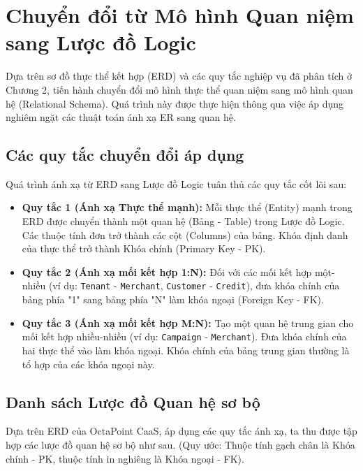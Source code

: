\section{Chuyển đổi từ Mô hình Quan niệm sang Lược đồ Logic}

Dựa trên sơ đồ thực thể kết hợp (ERD) và các quy tắc nghiệp vụ đã phân tích ở Chương 2, tiến hành chuyển đổi mô hình thực thể quan niệm sang mô hình quan hệ (Relational Schema). Quá trình này được thực hiện thông qua việc áp dụng nghiêm ngặt các thuật toán ánh xạ ER sang quan hệ.

\subsection{Các quy tắc chuyển đổi áp dụng}
Quá trình ánh xạ từ ERD sang Lược đồ Logic tuân thủ các quy tắc cốt lõi sau:

\begin{itemize}
    \item \textbf{Quy tắc 1 (Ánh xạ Thực thể mạnh):} Mỗi thực thể (Entity) mạnh trong ERD được chuyển thành một quan hệ (Bảng - Table) trong Lược đồ Logic. Các thuộc tính đơn trở thành các cột (Columns) của bảng. Khóa định danh của thực thể trở thành Khóa chính (Primary Key - PK).
    
    \item \textbf{Quy tắc 2 (Ánh xạ mối kết hợp 1:N):} Đối với các mối kết hợp một-nhiều (ví dụ: \texttt{Tenant} - \texttt{Merchant}, \texttt{Customer} - \texttt{Credit}), đưa khóa chính của bảng phía "1" sang bảng phía "N" làm khóa ngoại (Foreign Key - FK).
    
    \item \textbf{Quy tắc 3 (Ánh xạ mối kết hợp M:N):} Tạo một quan hệ trung gian cho mối kết hợp nhiều-nhiều (ví dụ: \texttt{Campaign} - \texttt{Merchant}). Đưa khóa chính của hai thực thể vào làm khóa ngoại. Khóa chính của bảng trung gian thường là tổ hợp của các khóa ngoại này.
\end{itemize}

\subsection{Danh sách Lược đồ Quan hệ sơ bộ}
Dựa trên ERD của OctaPoint CaaS, áp dụng các quy tắc ánh xạ, ta thu được tập hợp các lược đồ quan hệ sơ bộ như sau. (Quy ước: Thuộc tính gạch chân là Khóa chính - PK, thuộc tính in nghiêng là Khóa ngoại - FK).

